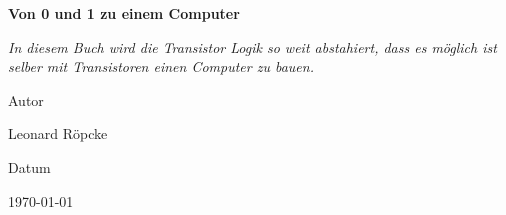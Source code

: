 \documentclass{book}
\newcommand{\AuthorName}{Leonard Röpcke}
\newcommand{\Subtitle}{In diesem Buch wird die Transistor Logik so weit abstahiert, dass es möglich ist selber mit Transistoren einen Computer zu bauen.}
\newcommand{\MyDate}{\today}
\begin{document}
\begin{titlepage}
  \centering
  {\scshape\LARGE \par}
  \vspace{2.5cm}
  {\huge\bfseries Von 0 und 1 zu einem Computer\par}
  \vspace{0.8cm}
  {\Large\itshape \Subtitle \par}
  \vfill
  {\Large Autor\par}
  {\Large \AuthorName \par}
  \vspace{1cm}
  {\Large Datum\par}
  {\Large \MyDate \par}
  \vfill
  \vspace{1cm}
  {\small }
\end{titlepage}
\tableofcontents
\newpage

\mainmatter




    







\end{document}
